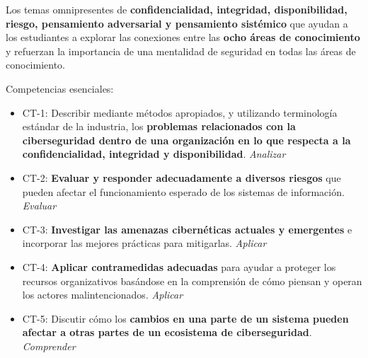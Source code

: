 \begin{tcolorbox}
[colback=gray!5!white,colframe=blue!10!gray,title= Conceptos transversales] Los temas omnipresentes de \textbf{confidencialidad, integridad, disponibilidad, riesgo, pensamiento adversarial y pensamiento sistémico} que ayudan a los estudiantes a explorar las conexiones entre las \textbf{ocho áreas de conocimiento} y refuerzan la importancia de una mentalidad de seguridad en todas las áreas de conocimiento.

\end{tcolorbox}
Competencias esenciales:
\begin{itemize}
    \item CT-1: Describir mediante métodos apropiados, y utilizando terminología estándar de la industria, los \textbf{problemas relacionados con la ciberseguridad dentro de una organización en lo que respecta a la confidencialidad, integridad y disponibilidad}. \textit{Analizar}
\item CT-2: \textbf{Evaluar y responder adecuadamente a diversos riesgos} que pueden afectar el funcionamiento esperado de los sistemas de información. \textit{Evaluar}
\item CT-3: \textbf{Investigar las amenazas cibernéticas actuales y emergentes} e incorporar las mejores prácticas para mitigarlas. \textit{Aplicar}
\item CT-4: \textbf{Aplicar contramedidas adecuadas} para ayudar a proteger los recursos organizativos basándose en la comprensión de cómo piensan y operan los actores malintencionados. \textit{Aplicar}
\item CT-5: Discutir cómo los \textbf{cambios en una parte de un sistema pueden afectar a otras partes de un ecosistema de ciberseguridad}. \textit{Comprender}
\end{itemize}



